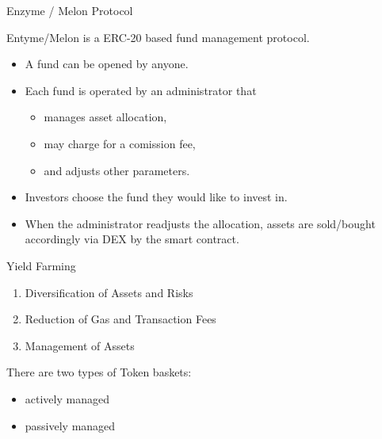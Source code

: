 \documentclass[handout]{beamer}
\begin{document}
\begin{frame}{Enzyme / Melon Protocol}

Entyme/Melon is a ERC-20 based fund management protocol.
\vspace{1em}

	\begin{itemize}
		\item<1-> A fund can be opened by anyone.
		\item<2-> Each fund is operated by an administrator that
	\begin{itemize}	
		\item<1-> manages asset allocation,
		\item<2-> may charge for a comission fee,
		\item<3-> and adjusts other parameters.
		
	\end{itemize}	
		\item<3-> Investors choose the fund they would like to invest in.
		\item<4-> When the administrator readjusts the allocation, assets are sold/bought accordingly via DEX by the smart contract.
	\end{itemize}
	
\end{frame}



\begin{frame}{Yield Farming}

 \vspace{1em}

	\begin{enumerate}
		\item<1-> Diversification of Assets and Risks
		\item<2-> Reduction of Gas and Transaction Fees
		\item<3-> Management of Assets
	\end{enumerate}
	
\vspace{1em}

There are two types of Token baskets: \vspace{1em}
	
	\begin{itemize}
		\item<4-> actively managed
		\item<5-> passively managed
	\end{itemize}
	

\end{frame}
\end{document}
